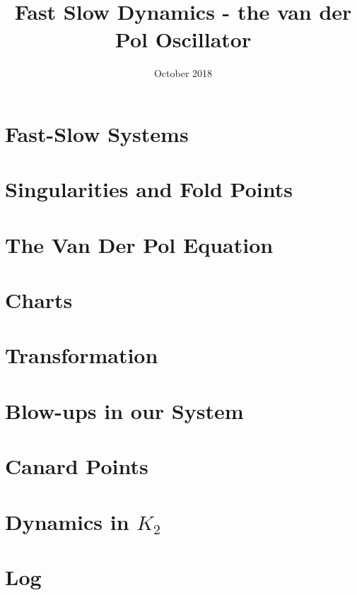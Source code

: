 \documentclass{article}
\title{Fast Slow Dynamics - the van der Pol Oscillator}
\author{}
\date{October 2018}
\begin{document}
\maketitle

\section{Fast-Slow Systems} \label{Intro}


\section{Singularities and Fold Points}


\section{The Van Der Pol Equation}


\section{Charts}\label{sec: charts}


\section{Transformation}


\section{Blow-ups in our System}\label{sec: VDP Blowup}


\section{Canard Points}

\newpage
\appendix
\section{Dynamics in \texorpdfstring{$K_2$}{K2}}

\newpage


\nocite{strogatz2007nonlinear}
\appendix
\section{Log}
\end{document}

